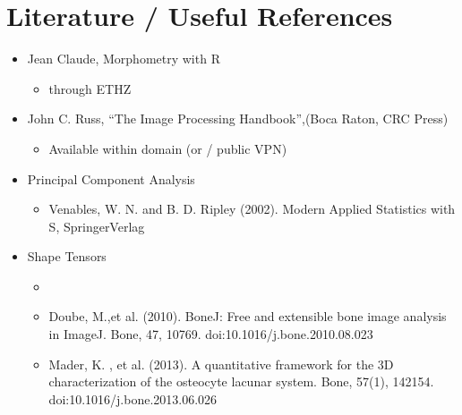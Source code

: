 \documentclass[letterpaper,10pt,english]{sphinxmanual}
\begin{document}
\section{Literature / Useful References}
\label{\detokenize{06-ShapeAnalysis:literature-useful-references}}\begin{itemize}
\item {} 
\sphinxAtStartPar
Jean Claude, Morphometry with R
\begin{itemize}
\item {} 
\sphinxAtStartPar
{} through ETHZ

\end{itemize}

\item {} 
\sphinxAtStartPar
John C. Russ, “The Image Processing Handbook”,(Boca Raton, CRC Press)
\begin{itemize}
\item {} 
\sphinxAtStartPar
Available  within domain  (or  / public VPN)

\end{itemize}

\item {} 
\sphinxAtStartPar
Principal Component Analysis
\begin{itemize}
\item {} 
\sphinxAtStartPar
Venables, W. N. and B. D. Ripley (2002). Modern Applied Statistics with S, Springer\sphinxhyphen{}Verlag

\end{itemize}

\item {} 
\sphinxAtStartPar
Shape Tensors
\begin{itemize}
\item {} 
\sphinxAtStartPar
{}

\item {} 
\sphinxAtStartPar
Doube, M.,et al. (2010). BoneJ: Free and extensible bone image analysis in ImageJ. Bone, 47, 1076\textendash{}9. doi:10.1016/j.bone.2010.08.023

\item {} 
\sphinxAtStartPar
Mader, K. , et al. (2013). A quantitative framework for the 3D characterization of the osteocyte lacunar system. Bone, 57(1), 142\textendash{}154. doi:10.1016/j.bone.2013.06.026


\end{itemize}
\end{itemize}
\end{document}
